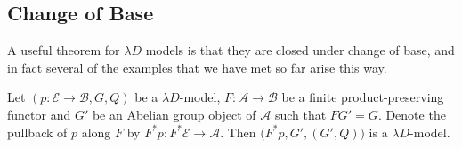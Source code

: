 \documentclass[a4paper,UKenglish]{lipics}
\newcommand{\ra}{\rightarrow}
\newcommand{\A}{\mathcal{A}}
\newcommand{\B}{\mathcal{B}}
\newcommand{\E}{\mathcal{E}}
\newcommand{\blank}{\, \underline{\hspace{2mm}} \,}
\newcommand{\bbracket}[1]{\bigl( #1 \bigr)}
\begin{document}
%

\subsection{Change of Base}
\label{sec:change-of-base}
A useful theorem for $\lambda D$ models is that they are closed under change of base, and in fact several of the examples that we have met so far arise this way.
\begin{theorem}
Let $(p: \E \ra \B, G, Q)$ be a $\lambda D$-model, $F:\A \ra \B$ be a finite product-preserving functor and $G'$ be an Abelian group object of $\A$ such that $FG' = G$.  Denote the pullback of $p$ along $F$ by $F^\ast p : F^\ast \E \rightarrow \A$. Then $\bbracket{F^{\ast}p, G', (G',Q)}$ is a $\lambda D$-model.
\end{theorem}
\end{document}
